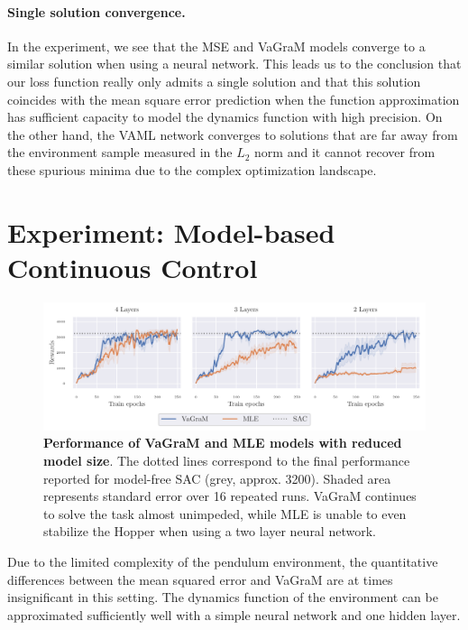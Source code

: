 \paragraph{Single solution convergence.}
In the experiment, we see that the MSE and VaGraM models converge to a similar solution when using a neural network. 
This leads us to the conclusion that our loss function really only admits a single solution and that this solution coincides with the mean square error prediction when the function approximation has sufficient capacity to model the dynamics function with high precision.
On the other hand, the VAML network converges to solutions that are far away from the environment sample measured in the $L_2$ norm and it cannot recover from these spurious minima due to the complex optimization landscape.


\section{{Experiment: Model-based Continuous Control}}

\begin{figure}[t]
\begin{center}
    \includegraphics[clip, trim=0.2cm 0.0cm 0.4cm 0.0cm, width=1.\linewidth]{figures/vagram/fig_2.pdf}
\end{center}
    \caption{\textbf{Performance of VaGraM and MLE models with reduced model size}. The dotted lines correspond to the final performance reported for model-free SAC (grey, approx. 3200). Shaded area represents standard error over 16 repeated runs. VaGraM continues to solve the task almost unimpeded, while MLE is unable to even stabilize the Hopper when using a two layer neural network.}
    \label{fig:vagram:pendulum_small}
\end{figure}
Due to the limited complexity of the pendulum environment, the quantitative differences between the mean squared error and VaGraM are at times insignificant in this setting.
The dynamics function of the environment can be approximated sufficiently well with a simple neural network and one hidden layer.

